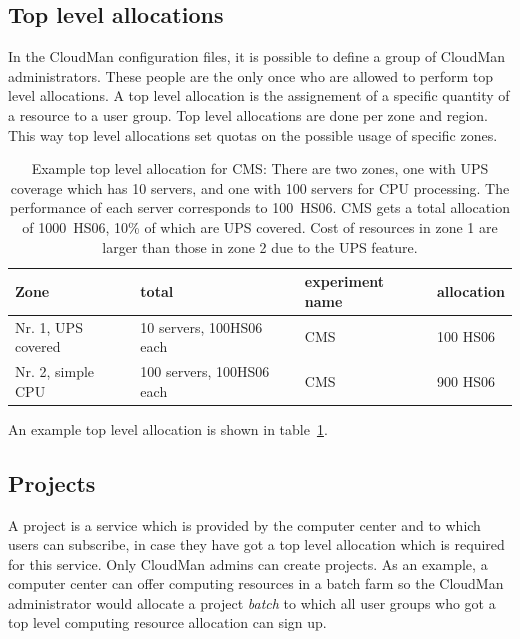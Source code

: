 \subsection{Top level allocations}
In the CloudMan configuration files, it is possible to define a group of CloudMan administrators. These people are the only once who are allowed to perform top level allocations. A top level allocation is the assignement of a specific quantity of a resource to a user group. Top level allocations are done per zone and region. This way top level allocations set quotas on the possible usage of specific zones. 
\begin{table}[htb]
\begin{center}
\begin{tabular}{|l|l|l|l|}
\hline
Zone & total & experiment name & allocation \\
\hline
Nr. 1, UPS covered & 10 servers, 100HS06 each & CMS &  100 HS06 \\
Nr. 2, simple CPU  & 100 servers, 100HS06 each & CMS & 900 HS06 \\
\hline
\end{tabular}
\end{center}
\caption{\label{toplevelCMS}Example top level allocation for CMS: There are two zones, one with UPS coverage which has 10 servers, and one with 100 servers for CPU processing. The performance of each server corresponds to 100~HS06. CMS gets a total allocation of 1000~HS06, 10\% of which are UPS covered.  Cost of resources in zone 1 are larger than those in zone 2 due to the UPS feature.}
\end{table}
An example top level allocation is shown in table~\ref{toplevelCMS}.

\subsection{Projects}
A project is a service which is provided by the computer center and to which users can subscribe, in case they have got a top level allocation which is required for this service. Only CloudMan admins can create projects.  As an example, a computer center can offer computing resources in a batch farm so the CloudMan administrator would allocate a project {\it batch} to which all user groups who got a top level computing resource allocation can sign up. 

